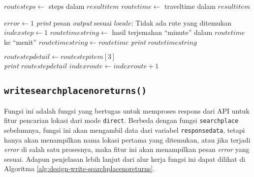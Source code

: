 \begin{algorithm}[h]
\begin{algorithmic}
			 
				\State $routesteps \gets$ \textquotesingle\textquotesingle steps\textquotesingle\textquotesingle\xspace dalam $resultitem$
				\State $routetime \gets$ \textquotesingle\textquotesingle traveltime\textquotesingle\textquotesingle\xspace dalam $resultitem$
				
					\State $error \gets 1$
					\State \textit{print} pesan \textit{output} sesuai $locale$: Tidak ada rute yang ditemukan
				\Else
					\State $indexstep \gets 1$
					 
						\State $routetimestring \gets$ hasil terjemahan ``minute'' dalam $routetime$ ke ``menit''
					\Else
						\State $routetimestring \gets routetime$
					\EndIf
					\State \textit{print} $routetimestring$
					
					 
						\State $routestepdetail \gets routestepitem[3]$ \\ 
						\State \textit{print $routestepdetail$}
					\EndFor
				\EndIf
				\State $indexroute \gets indexroute + 1$
			\EndFor
		\EndIf
	\end{algorithmic}
\end{algorithm}

\subsection{\texttt{write\textunderscore searchplace\textunderscore noreturns()}}
\label{sec:design-code-write-searchplacenoreturns}

Fungsi ini adalah fungsi yang bertugas untuk memproses respons dari API untuk fitur pencarian lokasi dari mode \verb|direct|. Berbeda dengan fungsi \verb|searchplace| sebelumnya, fungsi ini akan mengambil data dari variabel \verb|responsedata|, tetapi hanya akan menampilkan nama lokasi pertama yang ditemukan, atau jika terjadi \textit{error} di salah satu prosesnya, maka fitur ini akan menampilkan pesan \textit{error} yang sesuai. Adapun penjelasan lebih lanjut dari alur kerja fungsi ini dapat dilihat di Algoritma \ref{alg:design-write-searchplacenoreturns}.

